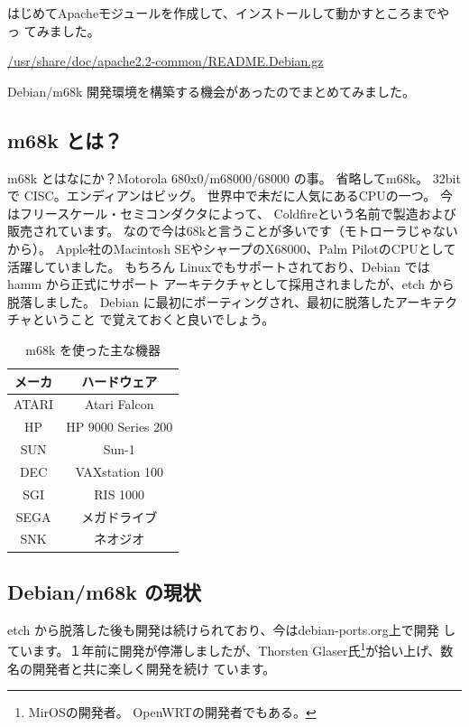\documentclass[mingoth,a4paper]{jsarticle}
\begin{document}
はじめてApacheモジュールを作成して、インストールして動かすところまでやっ
てみました。


\begin{thebibliography}{}
  \url{/usr/share/doc/apache2.2-common/README.Debian.gz}
\end{thebibliography}



Debian/m68k 開発環境を構築する機会があったのでまとめてみました。

\subsection{m68k とは？}
m68k とはなにか？Motorola 680x0/m68000/68000 の事。
省略してm68k。
32bit で CISC。エンディアンはビッグ。
世界中で未だに人気にあるCPUの一つ。
今はフリースケール・セミコンダクタによって、
Coldfireという名前で製造および販売されています。
なので今は68kと言うことが多いです（モトローラじゃないから）。
Apple社のMacintosh SEやシャープのX68000、Palm PilotのCPUとして活躍していました。
もちろん Linuxでもサポートされており、Debian では hamm から正式にサポート
アーキテクチャとして採用されましたが、etch から脱落しました。
Debian に最初にポーティングされ、最初に脱落したアーキテクチャということ
で覚えておくと良いでしょう。

\begin{table}[ht]
 \caption{m68k を使った主な機器}
 \label{tab:m68k-hard}
 \begin{center}
  \begin{tabular}{|c|c|}
 \hline
 メーカ & ハードウェア \\
 \hline
   ATARI & Atari Falcon \\
   HP & HP 9000 Series 200 \\
   SUN & Sun-1 \\
   DEC & VAXstation 100 \\
   SGI & RIS 1000 \\
   SEGA & メガドライブ \\
   SNK & ネオジオ \\
 \hline
 \end{tabular}
\end{center}
\end{table}


\subsection{Debian/m68k の現状}
etch から脱落した後も開発は続けられており、今はdebian-ports.org上で開発
しています。１年前に開発が停滞しましたが、Thorsten Glaser氏\footnote{MirOSの開発者。
OpenWRTの開発者でもある。}が拾い上げ、数名の開発者と共に楽しく開発を続け
ています。
\end{document}
